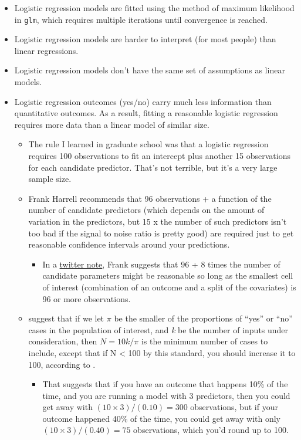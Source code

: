 \documentclass[]{book}
\providecommand{\tightlist}{%
  \setlength{\itemsep}{0pt}\setlength{\parskip}{0pt}}
\theoremstyle{definition}
\theoremstyle{definition}
\theoremstyle{definition}
\theoremstyle{remark}
\begin{document}
\begin{itemize}
\tightlist
\item
  Logistic regression models are fitted using the method of maximum
  likelihood in \texttt{glm}, which requires multiple iterations until
  convergence is reached.
\item
  Logistic regression models are harder to interpret (for most people)
  than linear regressions.
\item
  Logistic regression models don't have the same set of assumptions as
  linear models.
\item
  Logistic regression outcomes (yes/no) carry much less information than
  quantitative outcomes. As a result, fitting a reasonable logistic
  regression requires more data than a linear model of similar size.

  \begin{itemize}
  \tightlist
  \item
    The rule I learned in graduate school was that a logistic regression
    requires 100 observations to fit an intercept plus another 15
    observations for each candidate predictor. That's not terrible, but
    it's a very large sample size.
  \item
    Frank Harrell recommends that 96 observations + a function of the
    number of candidate predictors (which depends on the amount of
    variation in the predictors, but 15 x the number of such predictors
    isn't too bad if the signal to noise ratio is pretty good) are
    required just to get reasonable confidence intervals around your
    predictions.

    \begin{itemize}
    \tightlist
    \item
      In a
      \href{https://twitter.com/f2harrell/status/936230071219707913}{twitter
      note}, Frank suggests that 96 + 8 times the number of candidate
      parameters might be reasonable so long as the smallest cell of
      interest (combination of an outcome and a split of the covariates)
      is 96 or more observations.
    \end{itemize}
  \item
    \citet{Peduzzi1996} suggest that if we let \(\pi\) be the smaller of
    the proportions of ``yes'' or ``no'' cases in the population of
    interest, and \emph{k} be the number of inputs under consideration,
    then \(N = 10k/\pi\) is the minimum number of cases to include,
    except that if N \textless{} 100 by this standard, you should
    increase it to 100, according to \citet{Long1997}.

    \begin{itemize}
    \tightlist
    \item
      That suggests that if you have an outcome that happens 10\% of the
      time, and you are running a model with 3 predictors, then you
      could get away with \((10 \times 3)/(0.10) = 300\) observations,
      but if your outcome happened 40\% of the time, you could get away
      with only \((10 \times 3)/(0.40) = 75\) observations, which you'd
      round up to 100.
    \end{itemize}
  \end{itemize}
\end{itemize}
\end{document}
